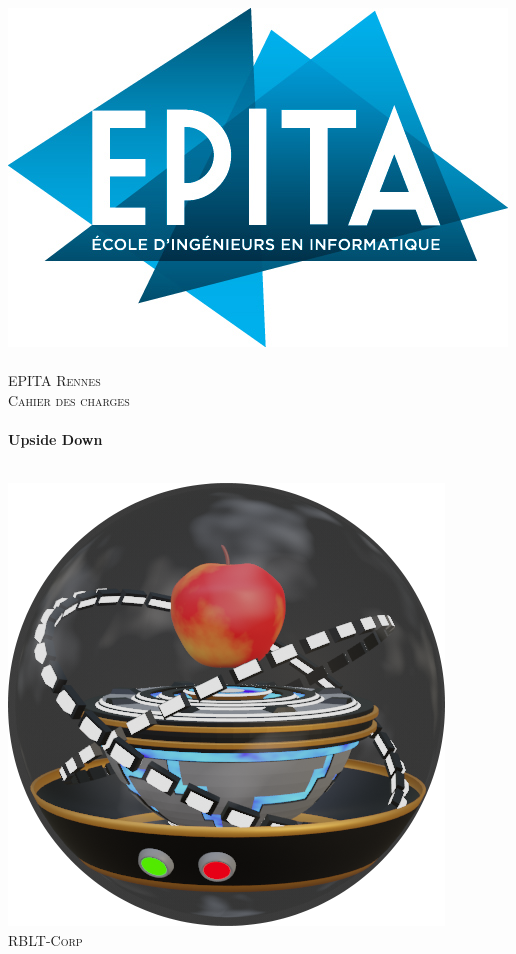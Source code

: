 
\begin{titlepage}
  \begin{sffamily}
  \begin{center}

  
    \includegraphics[scale=0.3]{pictures/logo}~\\[1.5cm]

    \textsc{\LARGE EPITA Rennes}\\[0.5cm]

    \textsc{\Large Cahier des charges}\\[1.5cm]

    \HRule \\[0.4cm]
     { \huge \bfseries Upside Down \\[0.4cm] }

    \HRule \\[1.5cm]
    \includegraphics[scale=0.3]{pictures/Gravi.png}
     \\[0.5cm]
    \textsc{\Large RBLT-Corp}\\[1.5cm]


\end{center}
\end{sffamily}
\end{titlepage}
